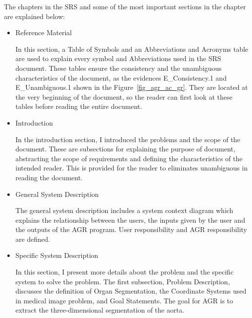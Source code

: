 The chapters in the SRS and some of the most important sections in the chapter are explained below:
\begin{itemize}
\item Reference Material

In this section, a Table of Symbols and an Abbreviations and Acronyms table are used to explain every symbol and Abbreviations used in the SRS document. These tables ensure the consistency and the unambiguous characteristics of the document, as the evidences E\_Consistency.1 and E\_Unambiguous.1 shown in the Figure~\ref{fig_agr_ac_gr}. They are located at the very beginning of the document, so the reader can first look at these tables before reading the entire document. 

\item Introduction

In the introduction section, I introduced the problems and the scope of the document.  These are subsections for explaining the purpose of document, abstracting the scope of requirements and defining the characteristics of the intended reader. This is provided for the reader to eliminates unambiguous in reading the document.

\item General System Description

The general system description includes a system context diagram which explains the relationship between the users, the inputs given by the user and the outputs of the AGR program. User responsibility and AGR responsibility are defined.

\item Specific System Description

In this section, I present more details about the problem and the specific system to solve the problem. The first subsection, Problem Description, discusses the definition of Organ Segmentation, the Coordinate Systems used in medical image problem, and Goal Statements. The goal for AGR is to extract the three-dimensional segmentation of the aorta.


\end{itemize}
